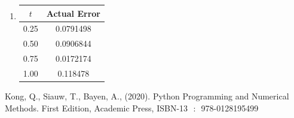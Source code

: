 \begin{posttest}[\textcolor{red}{End of Module 6 Quiz}]
\begin{mysolution}
\begin{enumerate}[label=\arabic*.]
\begin{enumerate}[label=(\alph*)]
\vspace{5mm}
\item
\begin{center}
\begin{tabular}{cc}
\hline
$t$ & Actual Error \\
\hline
0.25 & 0.0791498 \\
0.50 & 0.0906844 \\
0.75 & 0.0172174 \\
1.00 & 0.118478 \\
\hline
\end{tabular}
\end{center}
\end{enumerate}
\end{enumerate}
\end{mysolution}
\end{posttest}




\takehome




\begin{refenumerate}
\item Kong, Q., Siauw, T., Bayen, A., (2020). Python Programming and Numerical Methods. First Edition, Academic Press,  ISBN-13 ‏ : ‎ 978-0128195499 \\
\end{refenumerate}





